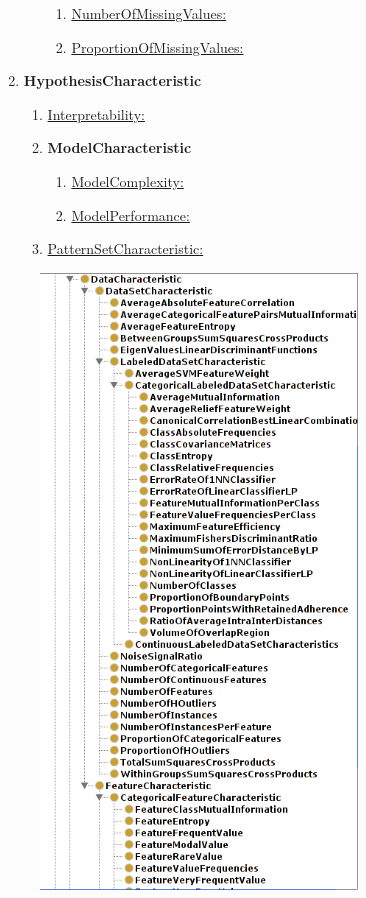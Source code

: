 \documentclass[a4paper,12pt, english]{article}
\begin{document}
\begin{enumerate}
\begin{enumerate}
\begin{enumerate}
		\item \underline{NumberOfMissingValues:}
		\item \underline{ProportionOfMissingValues:}
		\end{enumerate}
	\end{enumerate}
\item \textbf{HypothesisCharacteristic}
	\begin{enumerate}
	\item \underline{Interpretability:}
	\item \textbf{ModelCharacteristic}
		\begin{enumerate}
		\item \underline{ModelComplexity:}
		\item \underline{ModelPerformance:}
		\end{enumerate}	
	\item \underline{PatternSetCharacteristic:}
	\end{enumerate}	
\end{enumerate}
\newpage

\begin{figure}[h]   
  \centering 
  \includegraphics[width=0.75\textwidth]{figs/dmop1}
  \caption{}
  \label{fig:dmop1}
\end{figure}
\end{document}
